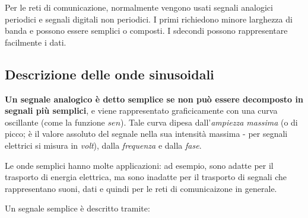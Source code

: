         \vspace{3mm}
        
        Per le reti di comunicazione, normalmente vengono usati segnali analogici periodici e segnali digitali non periodici. I primi richiedono minore larghezza di banda e possono essere semplici o composti. I sdecondi possono rappresentare facilmente i dati.
    
    \subsection{Descrizione delle onde sinusoidali}
    
        \textbf{Un segnale analogico è detto semplice se non può essere decomposto in segnali più semplici}, e viene rappresentato graficicamente con una curva oscillante (come la funzione \(sen\)). Tale curva dipesa dall'\textit{ampiezza massima} (o di picco; è il valore assoluto del segnale nella sua intensità massima - per segnali elettrici si misura in \textit{volt}), dalla \textit{frequenza} e dalla \textit{fase}.
        
        \vspace{3mm}
        
        Le onde semplici hanno molte applicazioni: ad esempio, sono adatte per il trasporto di energia elettrica, ma sono inadatte per il trasporto di segnali che rappresentano suoni, dati e quindi per le reti di comunicaizone in generale.
        
        \vspace{3mm}
        
        Un segnale semplice è descritto tramite:
        
